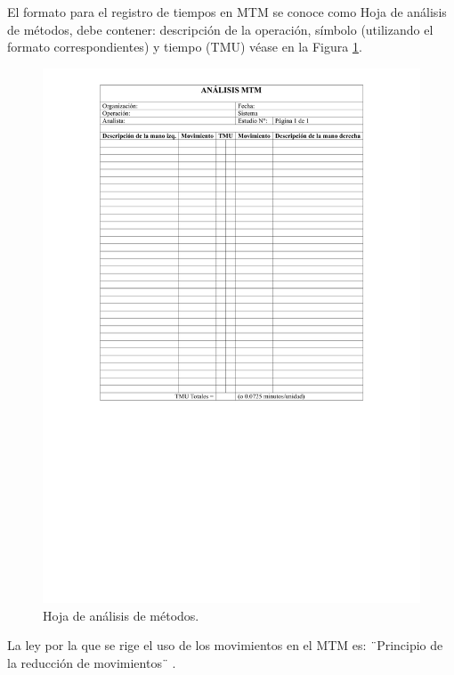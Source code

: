     
    El formato para el registro de tiempos en MTM se conoce como Hoja de análisis de métodos, debe contener: descripción de la operación, símbolo (utilizando el formato correspondientes) y tiempo (TMU) véase en la Figura \ref{fig:formatoRegistroMTM}. 
    
    \begin{figure}[H]
       \centering
        \includegraphics[scale=0.3]{15/img/formatoRegistroMTM.pdf}
        \caption{Hoja de análisis de métodos.}
        \label{fig:formatoRegistroMTM}
    \end{figure}
    
    
    La ley por la que se rige el uso de los movimientos en el MTM es: ¨Principio de la reducción de movimientos¨ \cite{estudio_del_trabajo_ii}.
